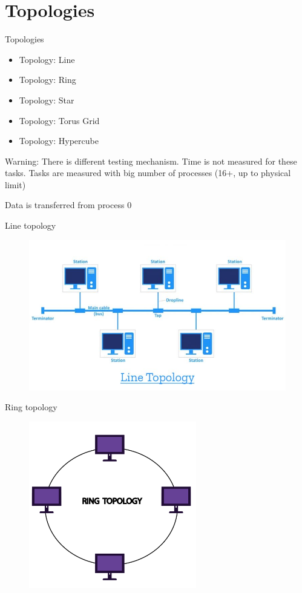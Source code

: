 \documentclass{beamer}
\begin{document}
\section{Topologies}

\begin{frame}{Topologies}
  \begin{itemize}
    \item Topology: Line
    \item Topology: Ring
    \item Topology: Star
    \item Topology: Torus Grid
    \item Topology: Hypercube
  \end{itemize}
  Warning:
  There is different testing mechanism. Time is not measured for these tasks.
  Tasks are measured with big number of processes (16+, up to physical limit)

  Data is transferred from process 0
\end{frame}

\begin{frame}{Line topology}
  \begin{figure}[h]
    \includegraphics[width=1\textwidth]{images/line-topology.jpg}
  \end{figure}
\end{frame}

\begin{frame}{Ring topology}
  \begin{figure}[h]
    \includegraphics[width=0.65\textwidth]{images/ring-topology.png}
  \end{figure}
\end{frame}
\end{document}
